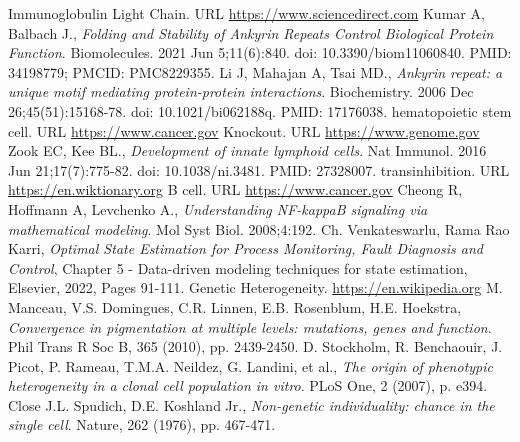 \documentclass[12pt,a4paper]{report}
\begin{document}
\begin{thebibliography}{bibliography}
     Immunoglobulin Light Chain. URL \href{https://www.sciencedirect.com/topics/immunology-and-microbiology/immunoglobulin-light-chain}{https://www.sciencedirect.com}
     Kumar A, Balbach J., {\em Folding and Stability of Ankyrin Repeats Control Biological Protein Function}. Biomolecules. 2021 Jun 5;11(6):840. doi: 10.3390/biom11060840. PMID: 34198779; PMCID: PMC8229355.
     Li J, Mahajan A, Tsai MD., {\em Ankyrin repeat: a unique motif mediating protein-protein interactions}. Biochemistry. 2006 Dec 26;45(51):15168-78. doi: 10.1021/bi062188q. PMID: 17176038.
     hematopoietic stem cell. URL \href{https://www.cancer.gov/publications/dictionaries/cancer-terms/def/hematopoietic-stem-cell}{https://www.cancer.gov}
     Knockout. URL \href{https://www.genome.gov/genetics-glossary/Knockout}{https://www.genome.gov}
     Zook EC, Kee BL., {\em Development of innate lymphoid cells}. Nat Immunol. 2016 Jun 21;17(7):775-82. doi: 10.1038/ni.3481. PMID: 27328007.
     transinhibition. URL \href{https://en.wiktionary.org/wiki/transinhibition}{https://en.wiktionary.org}
     B cell. URL \href{https://www.cancer.gov/publications/dictionaries/cancer-terms/def/b-cell}{https://www.cancer.gov}
     Cheong R, Hoffmann A, Levchenko A., {\em Understanding NF-kappaB signaling via mathematical modeling}. Mol Syst Biol. 2008;4:192.
     Ch. Venkateswarlu, Rama Rao Karri, {\em Optimal State Estimation for Process Monitoring, Fault Diagnosis and Control}, Chapter 5 - Data-driven modeling techniques for state estimation, Elsevier, 2022, Pages 91-111.
     Genetic Heterogeneity. \href{https://en.wikipedia.org/wiki/Genetic_heterogeneity}{https://en.wikipedia.org}
     M. Manceau, V.S. Domingues, C.R. Linnen, E.B. Rosenblum, H.E. Hoekstra, {\em Convergence in pigmentation at multiple levels: mutations, genes and function}. Phil Trans R Soc B, 365 (2010), pp. 2439-2450.
     D. Stockholm, R. Benchaouir, J. Picot, P. Rameau, T.M.A. Neildez, G. Landini, et al., {\em The origin of phenotypic heterogeneity in a clonal cell population in vitro}. PLoS One, 2 (2007), p. e394.
     Close J.L. Spudich, D.E. Koshland Jr., {\em Non-genetic individuality: chance in the single cell}. Nature, 262 (1976), pp. 467-471.

\end{thebibliography}
\end{document}
